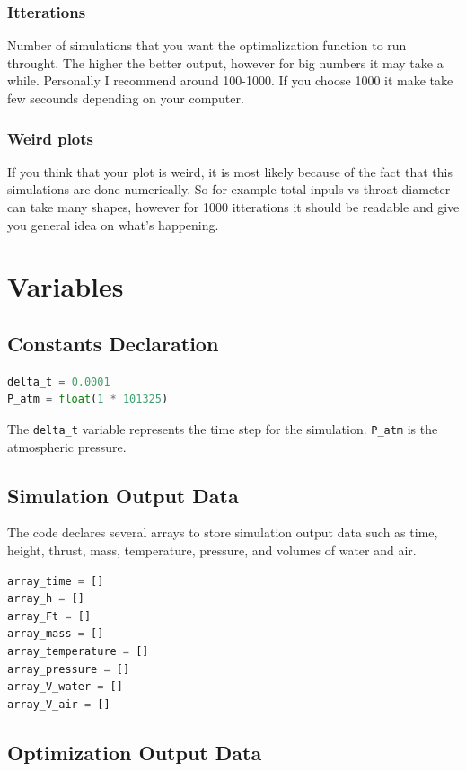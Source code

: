 \documentclass{report}
\begin{document}
\subsection*{Itterations}
Number of simulations that you want the optimalization function to run throught.  The higher the better output, however for big numbers it may take a while. Personally I recommend around 100-1000. If you choose 1000 it make take few secounds depending on your computer.

\subsection*{Weird plots}
If you think that your plot is weird, it is most likely because of the fact that this simulations are done numerically. So for example total inpuls vs throat diameter can take many shapes, however for 1000 itterations it should be readable and give you general idea on what's happening. 



\chapter{Variables}

\section{Constants Declaration}
 
\begin{lstlisting}[language=Python]
delta_t = 0.0001
P_atm = float(1 * 101325)
\end{lstlisting}
The \texttt{delta\_t} variable represents the time step for the simulation. \texttt{P\_atm} is the atmospheric pressure.

\section{Simulation Output Data}

The code declares several arrays to store simulation output data such as time, height, thrust, mass, temperature, pressure, and volumes of water and air.

\begin{lstlisting}[language=Python]
array_time = []
array_h = []
array_Ft = []
array_mass = []
array_temperature = []
array_pressure = []
array_V_water = []
array_V_air = []
\end{lstlisting}

\section{Optimization Output Data}
\end{document}
